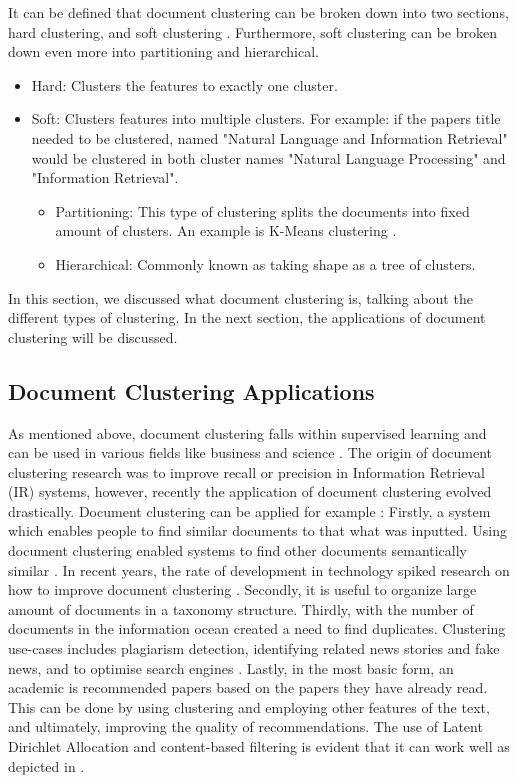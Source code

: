 It can be defined that document clustering can be broken down into two sections, hard clustering, and soft clustering \cite{chen2010integration}. Furthermore, soft clustering can be broken down even more into partitioning and hierarchical.
\begin{itemize}
\item Hard: Clusters the features to exactly one cluster.
\item Soft: Clusters features into multiple clusters. For example: if the papers title needed to be clustered, named "Natural Language and Information Retrieval" would be clustered in both cluster names "Natural Language Processing" and "Information Retrieval".
\begin{itemize}
    \item Partitioning: This type of clustering splits the documents into fixed amount of clusters. An example is K-Means clustering \cite{chen2010integration}. 
    \item Hierarchical: Commonly known as taking shape as a tree of clusters.
  \end{itemize}
\end{itemize}
In this section, we discussed what document clustering is, talking about the different types of clustering. In the next section, the applications of document clustering will be discussed.
\subsection{Document Clustering Applications}
As mentioned above, document clustering falls within supervised learning and can be used in various fields like business and science \cite{jain2010data}. The origin of document clustering research was to improve recall or precision in Information Retrieval (IR) systems, however, recently the application of document clustering evolved drastically.  Document clustering can be applied for example \cite{jajoo2008document,abualigah2017text}:
Firstly, a system which enables people to find similar documents to that what was inputted. Using document clustering enabled systems to find other documents semantically similar \cite{Shah2013}. In recent years, the rate of development in technology spiked research on how to improve document clustering \cite{alhawarat2018revisiting,mekonnen2017topic}. 
Secondly, it is useful to organize large amount of documents in a taxonomy structure.
Thirdly, with the number of documents in the information ocean created a need to find duplicates. Clustering use-cases includes plagiarism detection, identifying related news stories and fake news, and to optimise search engines \cite{jin2016news}.
Lastly, in the most basic form, an academic is recommended papers based on the papers they have already read. This can be done by using clustering and employing other features of the text, and ultimately, improving the quality of recommendations. The use of Latent Dirichlet Allocation and content-based filtering is evident that it can work well as depicted in \cite{yeh2010}.

